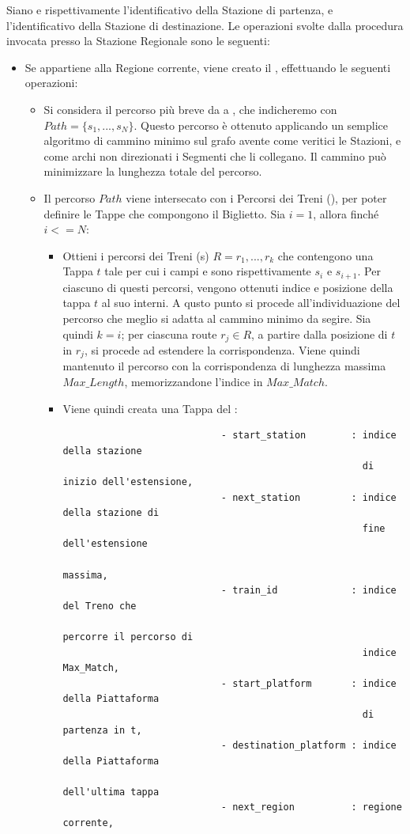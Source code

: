 	Siano  e  rispettivamente l'identificativo della Stazione di partenza, e l'identificativo della Stazione di destinazione. Le operazioni svolte dalla procedura invocata presso la Stazione Regionale sono le seguenti:
	\begin{itemize}
		\item Se  appartiene alla Regione corrente, viene creato il , effettuando le seguenti operazioni:
			\begin {itemize}
					
				\item Si considera il percorso più breve da  a , che indicheremo con $Path = \{s_1,...,s_N\}$. Questo percorso è ottenuto applicando un semplice algoritmo di cammino minimo sul grafo avente come veritici le Stazioni, e come archi non direzionati i Segmenti che li collegano. Il cammino può minimizzare la lunghezza totale del percorso.
				
				\item Il percorso $Path$ viene intersecato con i Percorsi dei Treni (), per poter definire le Tappe che compongono il Biglietto. Sia $i=1$, allora finché $i<=N$:
					\begin{itemize}
						\item Ottieni i percorsi dei Treni (s) $R={r_1,...,r_k}$ che contengono una Tappa $t$ tale per cui i campi  e  sono rispettivamente $s_i$ e $s_{i+1}$. Per ciascuno di questi percorsi, vengono ottenuti indice e posizione della tappa $t$ al suo interni.
						A qusto punto si procede all'individuazione del percorso che meglio si adatta al cammino minimo da segire. Sia quindi $k = i$; per ciascuna route $r_j \in R$, a partire dalla posizione di $t$ in $r_j$, si procede ad estendere la corrispondenza. Viene quindi mantenuto il percorso con la corrispondenza di lunghezza massima $Max\_Length$, memorizzandone l'indice in $Max\_Match$.
						\item Viene quindi creata una Tappa del :
						\begin{verbatim}
							- start_station        : indice della stazione 
							                         di inizio dell'estensione,
							- next_station         : indice della stazione di
							                         fine dell'estensione 
							                         massima,
							- train_id             : indice del Treno che 
							                         percorre il percorso di 
							                         indice Max_Match,
							- start_platform       : indice della Piattaforma
							                         di partenza in t,
							- destination_platform : indice della Piattaforma 
							                         dell'ultima tappa
							- next_region          : regione corrente,
							

\end{verbatim}
\end{itemize}
\end{itemize}
\end{itemize}
